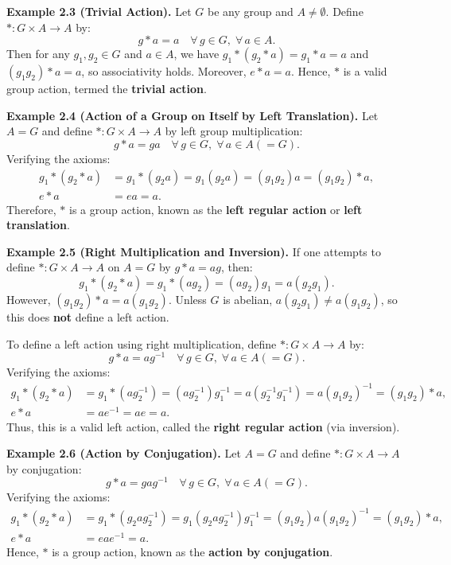 \documentclass[11pt,a4paper]{article}
\newcommand{\subsectiontitle}[1]{%
  \vspace{1.0em}%
  \noindent{\large\textbf{\color{slateDark}#1}}%
  \vspace{0.25em}\par\nopagebreak%
}
\begin{document}
\subsectiontitle{Standard Examples of Group Actions}

\begin{exbox}
\textbf{Example 2.3 (Trivial Action).} Let $G$ be any group and $A \ne \emptyset$. Define $* : G \times A \to A$ by:
\[
g * a = a \quad \forall\, g \in G, \; \forall\, a \in A.
\]
Then for any $g_1, g_2 \in G$ and $a \in A$, we have $g_1 * (g_2 * a) = g_1 * a = a$ and $(g_1 g_2) * a = a$, so associativity holds. Moreover, $e * a = a$. Hence, $*$ is a valid group action, termed the \textbf{trivial action}.
\end{exbox}

\begin{exbox}
\textbf{Example 2.4 (Action of a Group on Itself by Left Translation).} Let $A = G$ and define $* : G \times A \to A$ by left group multiplication:
\[
g * a = ga \quad \forall\, g \in G, \; \forall\, a \in A (= G).
\]
Verifying the axioms:
\begin{align*}
    g_1 * (g_2 * a) &= g_1 * (g_2 a) = g_1(g_2 a) = (g_1 g_2)a = (g_1 g_2) * a, \\
    e * a &= ea = a.
\end{align*}
Therefore, $*$ is a group action, known as the \textbf{left regular action} or \textbf{left translation}.
\end{exbox}

\begin{exbox}
\textbf{Example 2.5 (Right Multiplication and Inversion).} If one attempts to define $* : G \times A \to A$ on $A = G$ by $g * a = ag$, then:
\[
g_1 * (g_2 * a) = g_1 * (ag_2) = (ag_2)g_1 = a(g_2 g_1).
\]
However, $(g_1 g_2) * a = a(g_1 g_2)$. Unless $G$ is abelian, $a(g_2 g_1) \ne a(g_1 g_2)$, so this does \textbf{not} define a left action.

To define a left action using right multiplication, define $* : G \times A \to A$ by:
\[
g * a = ag^{-1} \quad \forall\, g \in G, \; \forall\, a \in A (= G).
\]
Verifying the axioms:
\begin{align*}
    g_1 * (g_2 * a) &= g_1 * (ag_2^{-1}) = (ag_2^{-1})g_1^{-1} = a(g_2^{-1} g_1^{-1}) = a(g_1 g_2)^{-1} = (g_1 g_2) * a, \\
    e * a &= ae^{-1} = ae = a.
\end{align*}
Thus, this is a valid left action, called the \textbf{right regular action} (via inversion).
\end{exbox}

\begin{exbox}
\textbf{Example 2.6 (Action by Conjugation).} Let $A = G$ and define $* : G \times A \to A$ by conjugation:
\[
g * a = gag^{-1} \quad \forall\, g \in G, \; \forall\, a \in A (= G).
\]
Verifying the axioms:
\begin{align*}
    g_1 * (g_2 * a) &= g_1 * (g_2 a g_2^{-1}) = g_1(g_2 a g_2^{-1})g_1^{-1} = (g_1 g_2)a(g_1 g_2)^{-1} = (g_1 g_2) * a, \\
    e * a &= eae^{-1} = a.
\end{align*}
Hence, $*$ is a group action, known as the \textbf{action by conjugation}.
\end{exbox}
\end{document}
